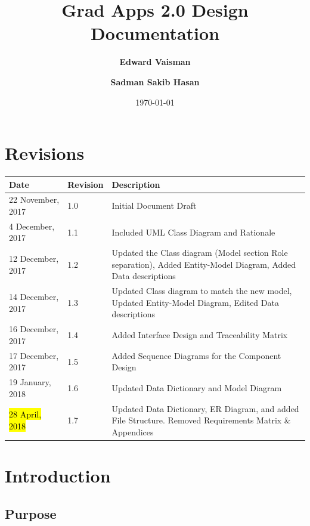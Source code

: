 \documentclass[fontsize=12pt,paper=letter,twoside]{scrartcl}
\author{\textbf{Edward Vaisman}
\and \textbf{Sadman Sakib Hasan}
}
\date{\today} %
\begin{document}
\title{Grad Apps 2.0 Design Documentation}
\maketitle

\newpage

\section*{Revisions}

\begin{tabular}{|l|l|p{3in}|}
\hline
Date & Revision & Description \\ 
\hline
22 November, 2017
& 1.0
& Initial Document Draft \\
\hline
4 December, 2017
& 1.1
& Included UML Class Diagram and Rationale \\
\hline
12 December, 2017
& 1.2
& Updated the Class diagram (Model section Role separation), Added Entity-Model Diagram, Added Data descriptions \\
\hline
14 December, 2017
& 1.3
& Updated Class diagram to match the new model, Updated Entity-Model Diagram, Edited Data descriptions \\
\hline
16 December, 2017
& 1.4
& Added Interface Design and Traceability Matrix \\
\hline
17 December, 2017
& 1.5
& Added Sequence Diagrams for the Component Design \\
\hline
19 January, 2018
& 1.6
& Updated Data Dictionary and Model Diagram \\
\hline
\hl{28 April, 2018}
& 1.7
& Updated Data Dictionary, ER Diagram, and added File Structure. Removed Requirements Matrix \& Appendices\\
\hline
\end{tabular}

\newpage

\tableofcontents
\listoffigures
\newpage



\clearpage
\section{Introduction}

\subsection{Purpose}
\end{document}
